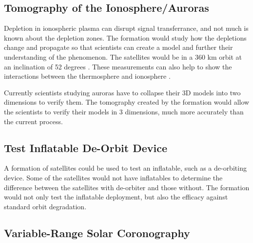 \subsection{Tomography of the Ionosphere/Auroras}

Depletion in ionospheric plasma can disrupt signal transferrance,
and not much is known about the depletion zones. The formation would
study how the depletions change and propagate so that scientists can
create a model and further their understanding of the phenomenon.
The satellites would be in a 360 km orbit at an inclination of 52
degrees \cite{Ref:Krause}\cite{Ref:Bracikowski}. These measurements
can also help to show the interactions between the thermosphere and
ionosphere \cite{Ref:Blalthazor}. 

Currently scientists studying auroras have to collapse their 3D models
into two dimensions to verify them. The tomography created by the
formation would allow the scientists to verify their models in 3 dimensions,
much more accurately than the current process. 


\subsection{Test Inflatable De-Orbit Device }

A formation of satellites could be used to test an inflatable, such
as a de-orbiting device. Some of the satellites would not have inflatables
to determine the difference between the satellites with de-orbiter
and those without. The formation would not only test the inflatable
deployment, but also the efficacy against standard orbit degradation. 

\subsection{Variable-Range Solar Coronography}

